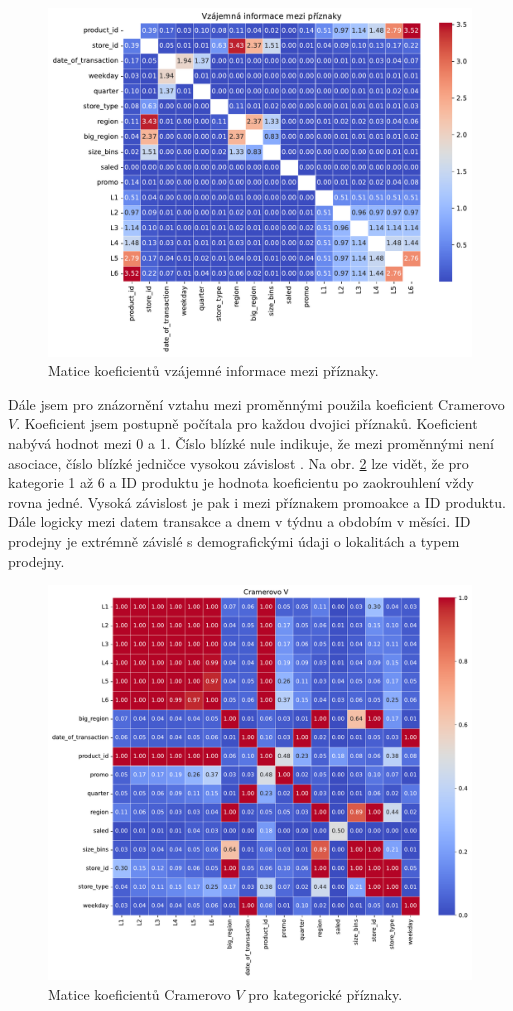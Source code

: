 \begin{figure}[hbtp!]
    \centering
    \includegraphics[width=.8\textwidth]{obrazky/pripravadat/matrix_MI-everything-SFF-storesFETURES-002.pdf}
    \caption{Matice koeficientů vzájemné informace mezi příznaky.}
    \label{obr:nb:MI}
\end{figure}

Dále jsem pro znázornění vztahu mezi proměnnými použila koeficient Cramerovo $V$. Koeficient jsem postupně počítala pro každou dvojici příznaků. Koeficient nabývá hodnot mezi 0 a 1. Číslo blízké nule indikuje, že mezi proměnnými není asociace, číslo blízké jedničce vysokou závislost \cite{bib:statology}. Na obr. \ref*{obr:nb:cramers} lze vidět, že pro kategorie 1 až 6 a ID produktu je hodnota koeficientu po zaokrouhlení vždy rovna jedné. Vysoká závislost je pak i mezi příznakem promoakce a ID produktu. Dále logicky mezi datem transakce a dnem v týdnu a obdobím v měsíci. ID prodejny je extrémně závislé s demografickými údaji o lokalitách a typem prodejny.

\begin{figure}[hbtp!]
    \centering
    \includegraphics[width=.8\textwidth]{obrazky/pripravadat/correlation_matrix_cramers-everything-SFF-stores_targets002.pdf}
    \caption{Matice koeficientů Cramerovo $V$ pro kategorické příznaky.}
    \label{obr:nb:cramers}
\end{figure}

